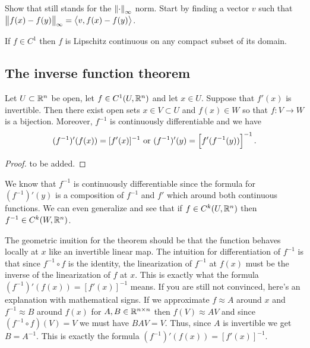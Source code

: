 \documentclass[11pt,a4paper]{article}
\begin{document}
\begin{exercise}
  Show that 
  still stands for the $\left\lVert\cdot\right\rVert_{\infty}$ norm.
  Start by finding a vector $v$ such that
  $\left\lVert f(x) - f(y)\right\rVert_{\infty} = \left\langle v, f(x) - f(y) \right\rangle$.
\end{exercise}

\begin{corollary}
  If $f \in C^1$ then $f$ is Lipschitz continuous on any compact
  subset of its domain.
\end{corollary}


\subsection{The inverse function theorem}
\begin{theorem}
  Let $U \subset \mathbb{R}^n$ be open,
  let $f \in C^1(U,\mathbb{R}^n)$ and let $x \in U$.
  Suppose that $f'(x)$ is invertible.
  Then there exist open sets $x \in V \subset U$ and $f(x) \in W$ so that
  $f \colon V \to W$ is a bijection.
  Moreover, $f^{-1}$ is continuously differentiable and we have
  \[
    (f^{-1})'(f(x)) = [f'(x)]^{-1} \text{ or }
    (f^{-1})'(y) = \left[f'(f^{-1}(y))\right]^{-1}.
  \]
\end{theorem}
\begin{proof}
  to be added.
\end{proof}
\begin{remark}
  We know that $f^{-1}$ is continuously differentiable
  since the formula for $(f^{-1})'(y)$
  is a composition of $f^{-1}$ and $f'$ which around both
  continuous functions.
  We can even generalize and see that if $f \in C^k(U,\mathbb{R}^n)$
  then $f^{-1} \in C^k(W,\mathbb{R}^n)$.
\end{remark}
\begin{remark}
  The geometric inuition for the theorem should be that
  the function behaves locally at $x$ like an invertible linear map.
  The intuition for differentiation of $f^{-1}$
  is that since $f^{-1} \circ f$ is the identity,
  the linearization of $f^{-1}$ at $f(x)$ must be the
  inverse of the linearization of $f$ at $x$.
  This is exactly what the formula $(f^{-1})'(f(x)) = [f'(x)]^{-1}$ means.
  If you are still not convinced, here's an explanation with mathematical signs.
  If we approximate $f \approx A$ around $x$ and $f^{-1} \approx B$
  around $f(x)$ for $A,B \in \mathbb{R}^{n \times n}$
  then $f(V) \approx AV$ and since $(f^{-1} \circ f)(V) = V$
  we must have $BAV = V$. Thus, since $A$ is invertible we get $B = A^{-1}$.
  This is exactly the formula $(f^{-1})'(f(x)) = [f'(x)]^{-1}$.
\end{remark}
\end{document}
